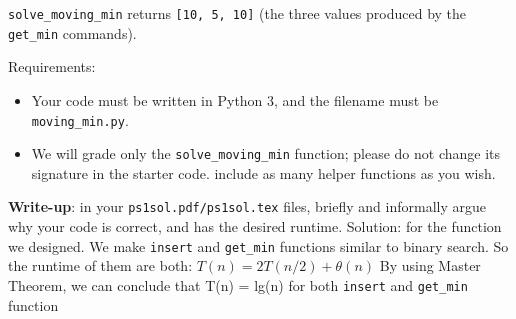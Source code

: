 \documentclass{assignment-263}
\begin{document}
\begin{enumerate}
\verb|solve_moving_min| returns \verb|[10, 5, 10]| (the three values produced by the \verb|get_min| commands).
   
Requirements:
\begin{itemize}
\item Your code must be written in Python 3, and the filename must be \verb|moving_min.py|.
\item We will grade only the \verb|solve_moving_min| function; please do not change its signature in the starter code. include as many helper functions as you wish.
   \end{itemize}
   
\textbf{Write-up}: in your \verb|ps1sol.pdf/ps1sol.tex| files, briefly and informally argue why your code is correct, and has the desired runtime.\vskip5pt
Solution: for the function we designed. We make \verb|insert| and \verb|get_min| functions similar to binary search. So the runtime of them are both: $T(n) = 2T(n/2) + \theta(n)$\vskip5pt
By using Master Theorem, we can conclude that T(n) = lg(n) for both \verb|insert| and \verb|get_min| function 

\end{enumerate}
\end{document}
